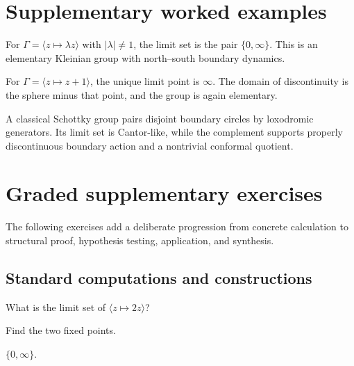 \section{Supplementary worked examples}
\label{sec:vii37-pedagogy}

\begin{example}\label{ex:vii37-ped-01}
For \(\Gamma=\langle z\mapsto\lambda z\rangle\) with \(|\lambda|\ne1\), the limit set is the pair \(\{0,\infty\}\).  This is an elementary Kleinian group with north--south boundary dynamics.
\end{example}

\begin{example}\label{ex:vii37-ped-02}
For \(\Gamma=\langle z\mapsto z+1\rangle\), the unique limit point is \(\infty\).  The domain of discontinuity is the sphere minus that point, and the group is again elementary.
\end{example}

\begin{example}\label{ex:vii37-ped-03}
A classical Schottky group pairs disjoint boundary circles by loxodromic generators.  Its limit set is Cantor-like, while the complement supports properly discontinuous boundary action and a nontrivial conformal quotient.
\end{example}

\section{Graded supplementary exercises}
The following exercises add a deliberate progression from concrete calculation to structural proof, hypothesis testing, application, and synthesis.

\subsection*{Standard computations and constructions}

\begin{exercise}\label{exr:vii37-ped-01}
What is the limit set of \(\langle z\mapsto2z\rangle\)?
\end{exercise}

\begin{hint}
Find the two fixed points.
\end{hint}

\begin{solution}
\(\{0,\infty\}\).
\end{solution}

